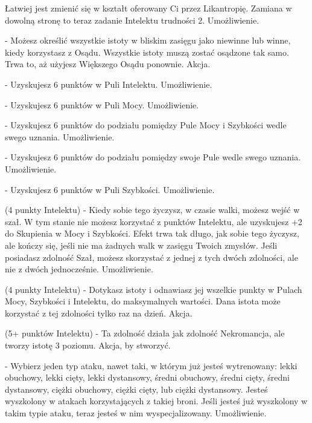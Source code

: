 { Łatwiej jest zmienić się w kształt oferowany Ci przez Likantropię. Zamiana w dowolną stronę to teraz zadanie Intelektu trudności 2. Umożliwienie.

 - Możesz określić wszystkie istoty w bliskim zasięgu jako niewinne lub winne, kiedy korzystasz z Osądu. Wszystkie istoty muszą zostać osądzone tak samo. Trwa to, aż użyjesz Większego Osądu ponownie. Akcja.

 - Uzyskujesz 6 punktów w Puli Intelektu. Umożliwienie.

 - Uzyskujesz 6 punktów w Puli Mocy. Umożliwienie. 

 - Uzyskujesz 6 punktów do podziału pomiędzy Pule Mocy i Szybkości wedle swego uznania. Umożliwienie.

 - Uzyskujesz 6 punktów do podziału pomiędzy swoje Pule wedle swego uznania. Umożliwienie.

 - Uzyskujesz 6 punktów w Puli Szybkości. Umożliwienie.

 (4 punkty Intelektu) - Kiedy sobie tego życzysz, w czasie walki, możesz wejść w szał. W tym stanie nie możesz korzystać z punktów Intelektu, ale uzyskujesz +2 do Skupienia w Mocy i Szybkości. Efekt trwa tak długo, jak sobie tego życzysz, ale kończy się, jeśli nie ma żadnych walk w zasięgu Twoich zmysłów. Jeśli posiadasz zdolność Szał, możesz skorzystać z jednej z tych dwóch zdolności, ale nie z dwóch jednocześnie. Umożliwienie.

 (4 punkty Intelektu) - Dotykasz istoty i odnawiasz jej wszelkie punkty w Pulach Mocy, Szybkości i Intelektu, do maksymalnych wartości. Dana istota może korzystać z tej zdolności tylko raz na dzień. Akcja.

 (5+ punktów Intelektu) - Ta zdolność działa jak zdolność Nekromancja, ale tworzy istotę 3 poziomu. Akcja, by stworzyć.

 - Wybierz jeden typ ataku, nawet taki, w którym już jesteś wytrenowany: lekki obuchowy, lekki cięty, lekki dystansowy, średni obuchowy, średni cięty, średni dystansowy, ciężki obuchowy, ciężki cięty, lub ciężki dystansowy. Jesteś wyszkolony w atakach korzystających z takiej broni. Jeśli jesteś już wyszkolony w takim typie ataku, teraz jesteś w nim wyspecjalizowany. Umożliwienie. 

}
